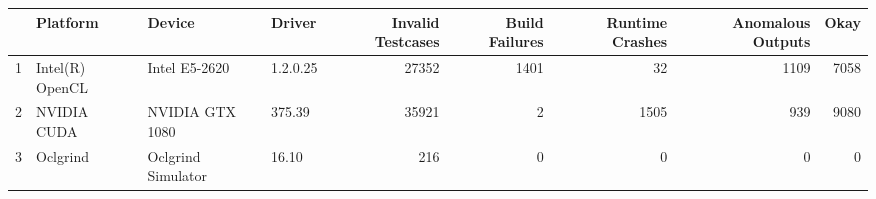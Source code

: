 \begin{tabular}{llllrrrrr}
\toprule
{} &         Platform &              Device &    Driver &  Invalid Testcases &  Build Failures &  Runtime Crashes &  Anomalous  Outputs &  Okay \\
\midrule
1 &  Intel(R) OpenCL &       Intel E5-2620 &  1.2.0.25 &              27352 &            1401 &               32 &                1109 &  7058 \\
2 &      NVIDIA CUDA &     NVIDIA GTX 1080 &    375.39 &              35921 &               2 &             1505 &                 939 &  9080 \\
3 &         Oclgrind &  Oclgrind Simulator &     16.10 &                216 &               0 &                0 &                   0 &     0 \\
\bottomrule
\end{tabular}
